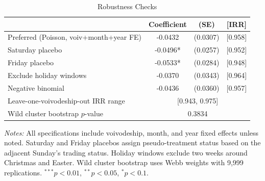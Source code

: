 \begin{table}[htbp]
\centering
\caption{Robustness Checks}
\label{tab:robustness}
\begin{tabular}{lccc}
\hline\hline
 & Coefficient & (SE) & [IRR] \\
\hline
  Preferred (Poisson, voiv+month+year FE) & -0.0432 & (0.0307) & [0.958] \\
  Saturday placebo & -0.0496* & (0.0257) & [0.952] \\
  Friday placebo & -0.0533* & (0.0284) & [0.948] \\
  Exclude holiday windows & -0.0370 & (0.0343) & [0.964] \\
  Negative binomial & -0.0436 & (0.0360) & [0.957] \\
\hline
  Leave-one-voivodeship-out IRR range & \multicolumn{3}{c}{[0.943, 0.975]} \\
  Wild cluster bootstrap $p$-value & \multicolumn{3}{c}{0.3834} \\
\hline\hline
\end{tabular}
\begin{tablenotes}[flushleft]
\small
\item \textit{Notes:} All specifications include voivodeship, month, and year fixed effects unless noted. Saturday and Friday placebos assign pseudo-treatment status based on the adjacent Sunday's trading status. Holiday windows exclude two weeks around Christmas and Easter. Wild cluster bootstrap uses Webb weights with 9,999 replications. $^{***}p<0.01$, $^{**}p<0.05$, $^{*}p<0.1$.
\end{tablenotes}
\end{table}

